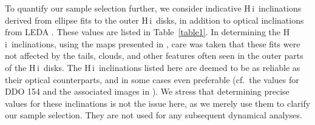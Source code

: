 \documentclass[usenatbib,usegraphicx,apjfonts,floatfix]{emulateapj}
\newcommand{\HI}{H\,{\sc i}}
\begin{document}
To quantify our sample selection further, we consider indicative
\HI\ inclinations derived from ellipse fits to the outer \HI\ disks,
in addition to optical inclinations from LEDA \citep{leda}. These
values are listed in Table~\ref{table1}. In determining the
\HI\ inclinations, using the maps presented in \citet{THINGS1}, care
was taken that these fits were not affected by the tails, clouds, and
other features often seen in the outer parts of the \HI\ disks. The
\HI\ inclinations listed here are deemed to be as reliable as their
optical counterparts, and in some cases even preferable (cf.\ the
values for DDO 154 and the associated images in \citealt{THINGS1}).
We stress that determining precise values for these inclinations is
not the issue here, as we merely use them to clarify our sample
selection. They are not used for any subsequent dynamical analyses.
\end{document}
